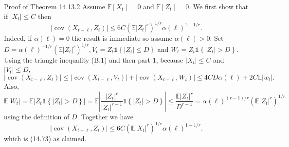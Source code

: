 \documentclass[10pt]{article}
\begin{document}
Proof of Theorem 14.13.2 Assume $\mathbb{E}\left[X_{t}\right]=0$ and $\mathbb{E}\left[Z_{t}\right]=0$. We first show that if $\left|X_{t}\right| \leq C$ then
$$
\left|\operatorname{cov}\left(X_{t-\ell}, Z_{t}\right)\right| \leq 6 C\left(\mathbb{E}\left|Z_{t}\right|^{r}\right)^{1 / r} \alpha(\ell)^{1-1 / r} .
$$
Indeed, if $\alpha(\ell)=0$ the result is immediate so assume $\alpha(\ell)>0$. Set $D=\alpha(\ell)^{-1 / r}\left(\mathbb{E}\left|Z_{t}\right|^{r}\right)^{1 / r}, V_{t}=Z_{t} \mathbb{1}\left\{\left|Z_{t}\right| \leq D\right\}$ and $W_{t}=Z_{t} \mathbb{1}\left\{\left|Z_{t}\right|>D\right\}$. Using the triangle inequality (B.1) and then part 1, because $\left|X_{t}\right| \leq C$ and $\left|V_{t}\right| \leq D$,
$$
\left|\operatorname{cov}\left(X_{t-\ell}, Z_{t}\right)\right| \leq\left|\operatorname{cov}\left(X_{t-\ell}, V_{t}\right)\right|+\left|\operatorname{cov}\left(X_{t-\ell}, W_{t}\right)\right| \leq 4 C D \alpha(\ell)+2 C \mathbb{E}\left|w_{t}\right| .
$$
Also,
$$
\mathbb{E}\left|W_{t}\right|=\mathbb{E}\left|Z_{t} \mathbb{1}\left\{\left|Z_{t}\right|>D\right\}\right|=\mathbb{E}\left|\frac{\left|Z_{t}\right|^{r}}{\left|Z_{t}\right|^{r-1}} \mathbb{1}\left\{\left|Z_{t}\right|>D\right\}\right| \leq \frac{\mathbb{E}\left|Z_{t}\right|^{r}}{D^{r-1}}=\alpha(\ell)^{(r-1) / r}\left(\mathbb{E}\left|Z_{t}\right|^{r}\right)^{1 / r}
$$
using the definition of $D$. Together we have
$$
\left|\operatorname{cov}\left(X_{t-\ell}, Z_{t}\right)\right| \leq 6 C\left(\mathbb{E}\left|X_{t}\right|^{r}\right)^{1 / r} \alpha(\ell)^{1-1 / r} .
$$
which is (14.73) as claimed.
\end{document}
